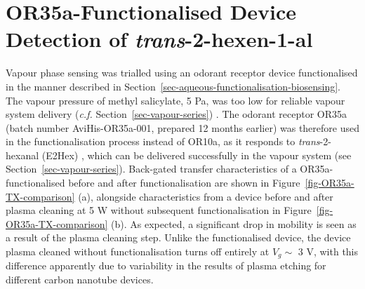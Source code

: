 \documentclass[
  a4paper,
]{scrbook}
\begin{document}
\hypertarget{or35a-functionalised-device-detection-of-trans-2-hexen-1-al}{%
\section{\texorpdfstring{OR35a-Functionalised Device Detection of
\emph{trans}-2-hexen-1-al}{OR35a-Functionalised Device Detection of trans-2-hexen-1-al}}\label{or35a-functionalised-device-detection-of-trans-2-hexen-1-al}}

Vapour phase sensing was trialled using an odorant receptor device
functionalised in the manner described in
Section~\ref{sec-aqueous-functionalisation-biosensing}. The vapour
pressure of methyl salicylate, 5 Pa, was too low for reliable vapour
system delivery (\emph{c.f.} Section~\ref{sec-vapour-series})
\autocite{MeSal}. The odorant receptor OR35a (batch number
AviHis-OR35a-001, prepared 12 months earlier) was therefore used in the
functionalisation process instead of OR10a, as it responds to
\emph{trans}-2-hexanal (E2Hex) \autocite{Murugathas2019a}, which can be
delivered successfully in the vapour system (see
Section~\ref{sec-vapour-series}). Back-gated transfer characteristics of
a OR35a-functionalised before and after functionalisation are shown in
Figure~\ref{fig-OR35a-TX-comparison} (a), alongside characteristics from
a device before and after plasma cleaning at 5 W without subsequent
functionalisation in Figure~\ref{fig-OR35a-TX-comparison} (b). As
expected, a significant drop in mobility is seen as a result of the
plasma cleaning step. Unlike the functionalised device, the device
plasma cleaned without functionalisation turns off entirely at
\(V_g \sim\) 3 V, with this difference apparently due to variability in
the results of plasma etching for different carbon nanotube devices.
\end{document}
